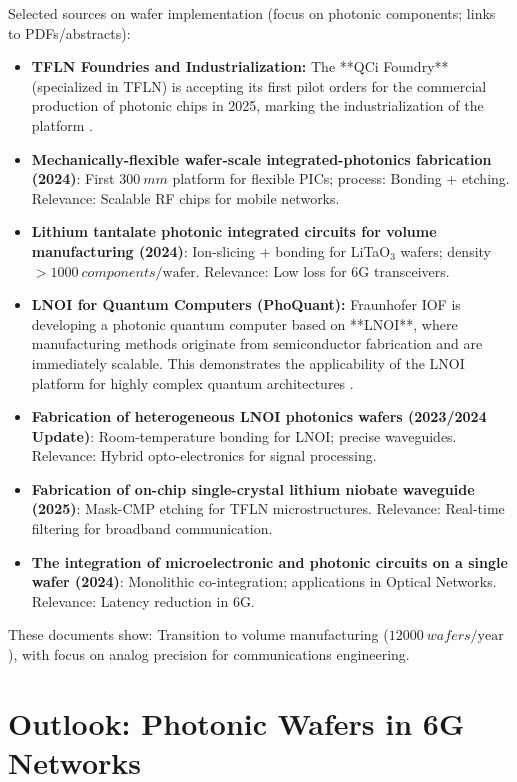 	Selected sources on wafer implementation (focus on photonic components; links to PDFs/abstracts):
	
	\begin{itemize}
		\item \textbf{TFLN Foundries and Industrialization:} The **QCi Foundry** (specialized in TFLN) is accepting its first pilot orders for the commercial production of photonic chips in 2025, marking the industrialization of the platform \cite{tfln_foundry}.
		\item \textbf{Mechanically-flexible wafer-scale integrated-photonics fabrication (2024)}: First $\SI{300}{mm}$ platform for flexible PICs; process: Bonding + etching. Relevance: Scalable RF chips for mobile networks. \cite{flexible_wafer}
		\item \textbf{Lithium tantalate photonic integrated circuits for volume manufacturing (2024)}: Ion-slicing + bonding for LiTaO$_3$ wafers; density $>\SI{1000}{components}/\text{wafer}$. Relevance: Low loss for 6G transceivers. \cite{lithium_tantalate}
		\item \textbf{LNOI for Quantum Computers (PhoQuant):} Fraunhofer IOF is developing a photonic quantum computer based on **LNOI**, where manufacturing methods originate from semiconductor fabrication and are immediately scalable. This demonstrates the applicability of the LNOI platform for highly complex quantum architectures \cite{phoquant}.
		\item \textbf{Fabrication of heterogeneous LNOI photonics wafers (2023/2024 Update)}: Room-temperature bonding for LNOI; precise waveguides. Relevance: Hybrid opto-electronics for signal processing. \cite{fabrication_heterogeneous}
		\item \textbf{Fabrication of on-chip single-crystal lithium niobate waveguide (2025)}: Mask-CMP etching for TFLN microstructures. Relevance: Real-time filtering for broadband communication. \cite{on_chip_lithium}
		\item \textbf{The integration of microelectronic and photonic circuits on a single wafer (2024)}: Monolithic co-integration; applications in Optical Networks. Relevance: Latency reduction in 6G. \cite{integration_microelectronic}
	\end{itemize}
	
	These documents show: Transition to volume manufacturing ($\SI{12000}{wafers}/\text{year}$), with focus on analog precision for communications engineering.
	
	\section{Outlook: Photonic Wafers in 6G Networks}
	
